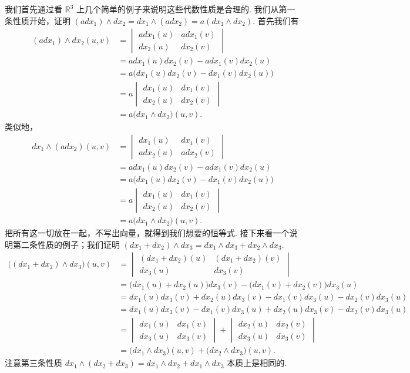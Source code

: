我们首先通过看 $\mathbb{R}^3$ 上几个简单的例子来说明这些代数性质是合理的. 我们从第一条性质开始，证明 $(adx_1)\wedge dx_2=dx_1\wedge(adx_2)=a(dx_1\wedge dx_2)$. 首先我们有
\begin{align*}
(adx_1)\wedge dx_2(u,v)
&=\begin{vmatrix}
adx_1(u) & adx_1(v)\\
dx_2(u) & dx_2(v)
\end{vmatrix}\\
&=adx_1(u)dx_2(v)-adx_1(v)dx_2(u)\\
&=a\bigl(dx_1(u)dx_2(v)-dx_1(v)dx_2(u)\bigr)\\
&=a\begin{vmatrix}
dx_1(u) & dx_1(v)\\
dx_2(u) & dx_2(v)
\end{vmatrix}\\
&=a\bigl(dx_1\wedge dx_2\bigr)(u,v).
\end{align*}
类似地，
\begin{align*}
dx_1\wedge(adx_2)(u,v)
&=\begin{vmatrix}
dx_1(u) & dx_1(v)\\
adx_2(u) & adx_2(v)
\end{vmatrix}\\
&=adx_1(u)dx_2(v)-adx_1(v)dx_2(u)\\
&=a\bigl(dx_1(u)dx_2(v)-dx_1(v)dx_2(u)\bigr)\\
&=a\begin{vmatrix}
dx_1(u) & dx_1(v)\\
dx_2(u) & dx_2(v)
\end{vmatrix}\\
&=a\bigl(dx_1\wedge dx_2\bigr)(u,v).
\end{align*}
把所有这一切放在一起，不写出向量，就得到我们想要的恒等式. 接下来看一个说明第二条性质的例子；我们证明 $(dx_1+dx_2)\wedge dx_3=dx_1\wedge dx_3+dx_2\wedge dx_3$.
\begin{align*}
\bigl((dx_1+dx_2)\wedge dx_3\bigr)(u,v)
&=\begin{vmatrix}
(dx_1+dx_2)(u) & (dx_1+dx_2)(v)\\
dx_3(u) & dx_3(v)
\end{vmatrix}\\
&=\bigl(dx_1(u)+dx_2(u)\bigr)dx_3(v)-\bigl(dx_1(v)+dx_2(v)\bigr)dx_3(u)\\
&=dx_1(u)dx_3(v)+dx_2(u)dx_3(v)-dx_1(v)dx_3(u)-dx_2(v)dx_3(u)\\
&=dx_1(u)dx_3(v)-dx_1(v)dx_3(u)+dx_2(u)dx_3(v)-dx_2(v)dx_3(u)\\
&=\begin{vmatrix}
dx_1(u) & dx_1(v)\\
dx_3(u) & dx_3(v)
\end{vmatrix}
+\begin{vmatrix}
dx_2(u) & dx_2(v)\\
dx_3(u) & dx_3(v)
\end{vmatrix}\\
&=\bigl(dx_1\wedge dx_3\bigr)(u,v)+\bigl(dx_2\wedge dx_3\bigr)(u,v).
\end{align*}
注意第三条性质 $dx_1\wedge(dx_2+dx_3)=dx_1\wedge dx_2+dx_1\wedge dx_3$ 本质上是相同的.

